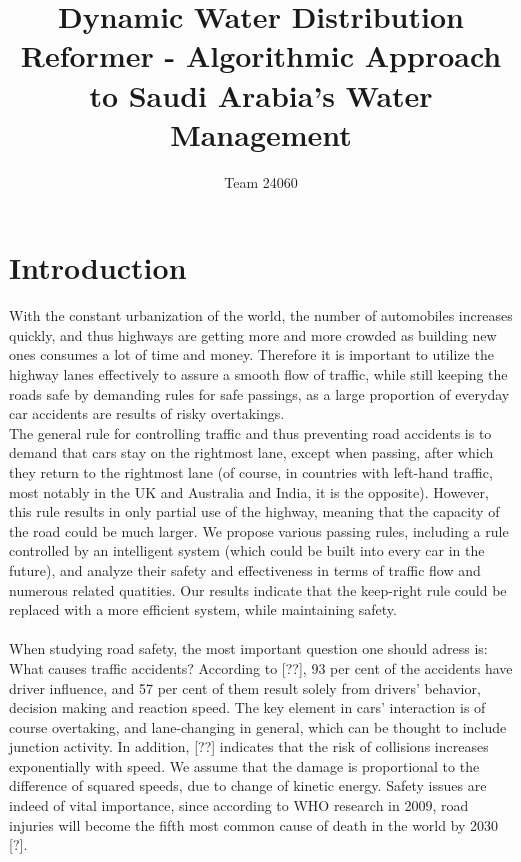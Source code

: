 \documentclass[12pt]{article}
\title{Dynamic Water Distribution Reformer - Algorithmic Approach to Saudi Arabia's Water Management}
\author{Team 24060}
\date{}                                           %
\begin{document}
\maketitle
\begin{abstract}
\end{abstract}
\setlength{\parindent}{0cm}
\newpage
\tableofcontents
\newpage


\section{Introduction}

With the constant urbanization of the world, the number of automobiles increases quickly, and thus highways are getting more and more crowded as building new ones consumes a lot of time and money. Therefore it is important to utilize the highway lanes effectively to assure a smooth flow of traffic, while still keeping the roads safe by demanding rules for safe passings, as a large proportion of everyday car accidents are results of risky overtakings.\\

 The general rule for controlling  traffic and thus preventing road accidents is to demand that cars stay on the rightmost lane, except when passing, after which they return to the rightmost lane (of course, in countries with left-hand traffic, most notably in the UK and Australia and India, it is the opposite).  However, this rule results in only partial use of the highway, meaning that the capacity  of the road could be much larger. We propose various passing rules, including a rule controlled by an intelligent system (which could be built into every car in the future), and analyze their safety and effectiveness in terms of traffic flow and numerous related quatities. Our results indicate that the keep-right rule could be replaced with a more efficient system, while maintaining safety. %
\\\\


When studying road safety, the most important question one should adress is: What causes traffic accidents? According to [??], 93 per cent of the accidents have driver influence, and 57 per cent of them result solely from drivers' behavior, decision making and reaction speed. The key element in cars' interaction is of course overtaking, and lane-changing in general, which can be thought to include junction activity. In addition, [??] indicates that the risk  of collisions increases exponentially with speed. We assume that the damage is proportional to the difference of squared speeds, due to change of kinetic energy. Safety issues are indeed of vital importance, since according to WHO research in 2009, road injuries will become the fifth most common cause of death in the world by 2030 [?].
\newpage
\end{document}

